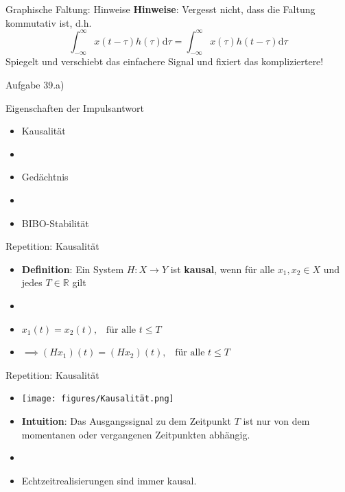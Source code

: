 \documentclass[14pt, aspectratio=169, handout]{beamer}
\begin{document}
\begin{frame}{Graphische Faltung: Hinweise}
    \textbf{Hinweise}: Vergesst nicht, dass die Faltung kommutativ ist, d.h.
    $$\int_{-\infty}^\infty x(t-\tau) h(\tau) \text{d}\tau = \int_{-\infty}^\infty x(\tau) h(t-\tau) \text{d}\tau$$
    Spiegelt und verschiebt das einfachere Signal und fixiert das kompliziertere!
\end{frame}

\begin{frame}{Aufgabe 39.a)}
    
\end{frame}

\begin{frame}{Eigenschaften der Impulsantwort}
    \begin{itemize}
        \item Kausalität
        \item[] 
        \item Gedächtnis
        \item[] 
        \item BIBO-Stabilität
    \end{itemize}
\end{frame}

\begin{frame}{Repetition: Kausalität}
    \begin{itemize}
        \item \textbf{Definition}: Ein System $H:X \to Y$ ist \textbf{kausal}, wenn für alle $x_1, x_2 \in X$ und jedes $T\in \mathbb{R}$ gilt
        \item[] 
        \item[] $x_1(t) = x_2(t), \hspace{10pt} \text{für alle } t \leq T $
        \item[] \vspace{0.25cm}$\implies (Hx_1)(t) = (Hx_2)(t), \hspace{10pt} \text{für alle } t \leq T$
    \end{itemize}
\end{frame}

\begin{frame}{Repetition: Kausalität}
    \begin{itemize}
        \item[] \begin{center}
        \texttt{[image: figures/Kausalität.png]}
        \end{center}
        \item \textbf{Intuition}: Das Ausgangssignal zu dem Zeitpunkt $T$ ist nur von dem momentanen oder vergangenen Zeitpunkten abhängig.
        \item[] 
        \item Echtzeitrealisierungen sind immer kausal.
    \end{itemize}
\end{frame}
\end{document}
